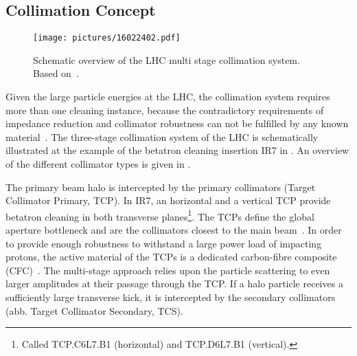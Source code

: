 \subsection{Collimation Concept}
%
  \begin{figure}[b]
    \centering
    \texttt{[image: pictures/16022402.pdf]}
    \caption{Schematic overview of the LHC multi stage collimation system. Based on~\cite{courier2013_collimation}.}  
    \label{pic:15071001}
  \end{figure}
%
Given the large particle energies at the LHC, the collimation system requires more than one cleaning instance, because the contradictory requirements of impedance reduction and collimator robustness can not be fulfilled by any known material~\citedr. The three-stage collimation system of the LHC is schematically illustrated at the example of the betatron cleaning insertion IR7 in . An overview of the different collimator types is given in .

The primary beam halo is intercepted by the primary collimators (Target Collimator Primary, TCP). In IR7, an horizontal and a vertical TCP provide betatron cleaning in both transverse planes\footnote{Called \textsc{TCP.C6L7.B1} (horizontal) and \textsc{TCP.D6L7.B1} (vertical).}. The TCPs define the global aperture bottleneck and are the collimators closest to the main beam~\cite{}. In order to provide enough robustness to withstand a large power load of impacting protons, the active material of the TCPs is a dedicated carbon-fibre composite (CFC)~\citedr. The multi-stage approach relies upon the particle scattering to even larger amplitudes at their passage through the TCP. If a halo particle receives a sufficiently large transverse kick, it is intercepted by the secondary collimators (abb. Target Collimator Secondary, TCS). 





